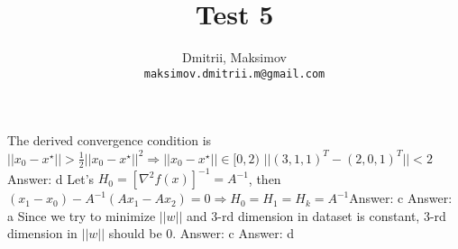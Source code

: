 \documentclass{homework}
\title{Test 5}
\author{
  Dmitrii, Maksimov\\
  \texttt{maksimov.dmitrii.m@gmail.com}
}
\begin{document}
\maketitle

\exercise
The derived convergence condition is $||x_0 - x^\star|| > \frac{1}{2}||x_0 - x^\star||^2\Rightarrow ||x_0 - x^\star|| \in [0, 2)$ \newline
$||(3, 1, 1)^T- (2, 0,1)^T|| < 2$  \newline
Answer: d
\exercise*
Let's $H_0 = [\nabla^2f(x)]^{-1}=A^{-1}$, then $(x_1-x_0) - A^{-1}(Ax_1 - Ax_2)=0\Rightarrow H_0=H_1=H_k=A^{-1}$\newline Answer: c
\exercise*
Answer: a
\exercise*
Since we try to minimize $||w||$ and 3-rd dimension in dataset is constant, 3-rd dimension in $||w||$ should be 0. \newline Answer: c
\exercise*
Answer: d
\end{document}
